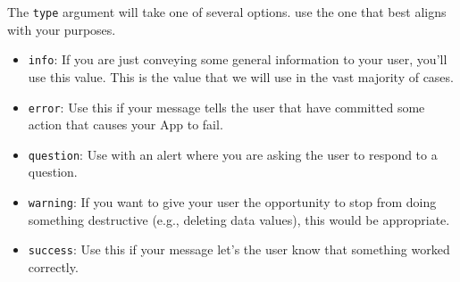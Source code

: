 \documentclass[
]{book}
\newenvironment{Shaded}{\begin{snugshade}}{\end{snugshade}}
\newcommand{\CommentTok}[1]{\textcolor[rgb]{0.56,0.35,0.01}{\textit{#1}}}
\newcommand{\DataTypeTok}[1]{\textcolor[rgb]{0.13,0.29,0.53}{#1}}
\newcommand{\KeywordTok}[1]{\textcolor[rgb]{0.13,0.29,0.53}{\textbf{#1}}}
\newcommand{\NormalTok}[1]{#1}
\newcommand{\OperatorTok}[1]{\textcolor[rgb]{0.81,0.36,0.00}{\textbf{#1}}}
\newcommand{\StringTok}[1]{\textcolor[rgb]{0.31,0.60,0.02}{#1}}
\providecommand{\tightlist}{%
  \setlength{\itemsep}{0pt}\setlength{\parskip}{0pt}}
\begin{document}
\begin{Shaded}
\end{Shaded}

The \texttt{type} argument will take one of several options. use the one that best aligns with your purposes.

\begin{itemize}
\tightlist
\item
  \texttt{info}: If you are just conveying some general information to your user, you'll use this value. This is the value that we will use in the vast majority of cases.
\item
  \texttt{error}: Use this if your message tells the user that have committed some action that causes your App to fail.
\item
  \texttt{question}: Use with an alert where you are asking the user to respond to a question.
\item
  \texttt{warning}: If you want to give your user the opportunity to stop from doing something destructive (e.g., deleting data values), this would be appropriate.
\item
  \texttt{success}: Use this if your message let's the user know that something worked correctly.
\end{itemize}
\end{document}
